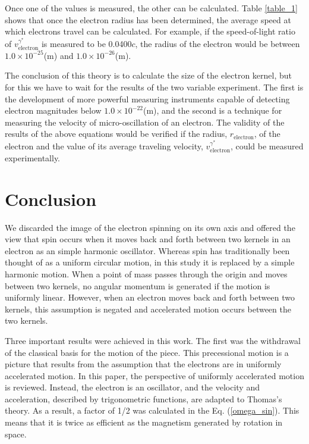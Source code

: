 \documentclass[10.5pt]{article}
\numberwithin{equation}{section}
\begin{document}
Once one of the values is measured, the other can be calculated. Table \ref{table_1} shows that once the electron radius has been determined, the average speed at which electrons travel can be calculated. For example, if the speed-of-light ratio of $ v_{\text{electron}}^{\gamma^{*}} $ is measured to be 0.0400$c$, the radius of the electron would be between $1.0 \times 10^{-25}$(m) and $1.0 \times 10^{-26}$(m).


The conclusion of this theory is to calculate the size of the electron kernel, but for this we have to wait for the results of the two variable experiment. The first is the development of more powerful measuring instruments capable of detecting electron magnitudes below $1.0 \times 10^{-22}$(m), and the second is a technique for measuring the velocity of micro-oscillation of an electron. The validity of the results of the above equations would be verified if the radius, $r_{\mathrm{electron}}$, of the electron and the value of its average traveling velocity, $ v_{\text{electron}}^{\gamma^{*}} $, could be measured experimentally.


\section{Conclusion}


We discarded the image of the electron spinning on its own axis and offered the view that spin occurs when it moves back and forth between two kernels in an electron as an simple harmonic oscillator. Whereas spin has traditionally been thought of as a uniform circular motion, in this study it is replaced by a simple harmonic motion. When a point of mass passes through the origin and moves between two kernels, no angular momentum is generated if the motion is uniformly linear. However, when an electron moves back and forth between two kernels, this assumption is negated and accelerated motion occurs between the two kernels.

Three important results were achieved in this work. The first was the withdrawal of the classical basis for the motion of the piece. This precessional motion is a picture that results from the assumption that the electrons are in uniformly accelerated motion. In this paper, the perspective of uniformly accelerated motion is reviewed. Instead, the electron is an oscillator, and the velocity and acceleration, described by trigonometric functions, are adapted to Thomas's theory. As a result, a factor of 1/2 was calculated in the Eq. (\ref{omega_sin}). This means that it is twice as efficient as the magnetism generated by rotation in space.
\end{document}
